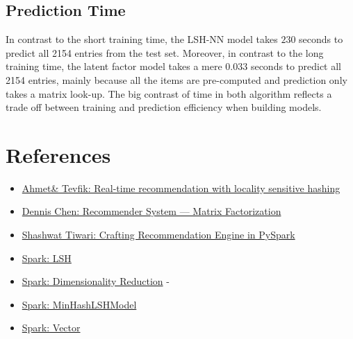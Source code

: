 \documentclass{scrartcl}
\begin{document}
\subsection{Prediction Time}
In contrast to the short training time, the LSH-NN model takes $230$ seconds to predict all 2154 entries from the test set. Moreover, in contrast to the long training time, the latent factor model takes a mere $0.033$ seconds to predict all 2154 entries, mainly because all the items are pre-computed and prediction only takes a matrix look-up. The big contrast of time in both algorithm reflects a trade off between training and prediction efficiency when building models.
\section{References}
\begin{itemize}
  \item \href{https://doi.org/10.1007/s10844-019-00552-1}{Ahmet\& Tevfik: Real-time recommendation with locality sensitive hashing}
  \item \href{https://towardsdatascience.com/recommendation-system-matrix-factorization-d61978660b4b}{Dennis Chen: Recommender System — Matrix Factorization}
  \item \href{https://medium.com/analytics-vidhya/crafting-recommendation-engine-in-pyspark-a7ca242ad40a}{Shashwat Tiwari: Crafting Recommendation Engine in PySpark}
  \item \href{https://spark.apache.org/docs/2.2.3/ml-features.html#locality-sensitive-hashing}{Spark: LSH}
  \item \href{https://spark.apache.org/docs/2.2.0/mllib-dimensionality-reduction.html}{Spark: Dimensionality Reduction}
- \item \href{https://spark.apache.org/docs/latest/api/python/reference/api/pyspark.ml.feature.MinHashLSHModel.html#pyspark.ml.feature.MinHashLSHModel.approxNearestNeighbors}{Spark: MinHashLSHModel}
  \item \href{https://spark.apache.org/docs/1.1.0/mllib-data-types.html}{Spark: Vector}
\end{itemize}
\end{document}
